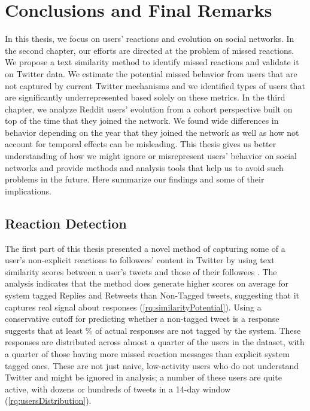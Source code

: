 \chapter{Conclusions and Final Remarks\raisebox{.3\baselineskip}{\normalsize\footnotemark}}
\label{ch:conclusions}

In this thesis, we focus on users' reactions and evolution on social networks. In the second chapter, our efforts are directed at the problem of missed reactions. We propose a text similarity method to identify missed reactions and validate it on Twitter data. We estimate the potential missed behavior from users that are not captured by current Twitter mechanisms and we identified types of users that are significantly underrepresented based solely on these metrics. In the third chapter, we analyze Reddit users' evolution from a cohort perspective built on top of the time that they joined the network. We found wide differences in behavior depending on the year that they joined the network as well as how not account for temporal effects can be misleading. This thesis gives us better understanding of how we might ignore or misrepresent users' behavior on social networks and provide methods and analysis tools that help us to avoid such problems in the future. Here summarize our findings and some of their implications.

\section{Reaction Detection}

The first part of this thesis presented a novel method of capturing some of a user's non-explicit reactions to followees' content in Twitter by using text similarity scores between a user's tweets and those of their followees \cite{Barbosa}.  The analysis indicates that the method does generate higher scores on average for system tagged Replies and Retweets than Non-Tagged tweets, suggesting that it captures real signal about responses (\ref{rq:similarityPotential}).  Using a conservative cutoff for predicting whether a non-tagged tweet is a response suggests that at least \highNonTaggedTweetCountPct{}\% of actual responses are not tagged by the system.  These responses are distributed across almost a quarter of the users in the dataset, with a quarter of those having more missed reaction messages than explicit system tagged ones. These are not just naive, low-activity users who do not understand Twitter and might be ignored in analysis; a number of these users are quite active, with dozens or hundreds of tweets in a 14-day window (\ref{rq:usersDistribution}).  

